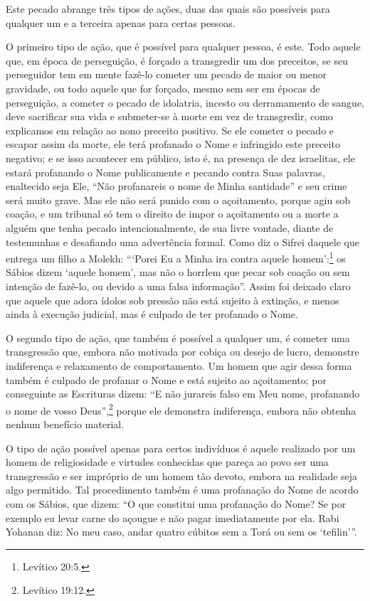 Este pecado abrange três tipos de ações, duas das quais são possíveis
para qualquer um e a terceira apenas para certas pessoas.

O primeiro tipo de ação, que é possível para qualquer pessoa, é este.
Todo aquele que, em época de perseguição, é forçado a transgredir um dos
preceitos, se seu perseguidor tem em mente fazê-lo cometer um pecado de
maior ou menor gravidade, ou todo aquele que for forçado, mesmo sem ser
em épocas de perseguição, a cometer o pecado de idolatria, incesto ou
derramamento de sangue, deve sacrificar sua vida e submeter-se à morte
em vez de transgredir, como explicamos em relação ao nono preceito
positivo. Se ele cometer o pecado e escapar assim da morte, ele terá
profanado o Nome e infringido este preceito negativo; e se isso
acontecer em público, isto é, na presença de dez israelitas, ele estará
profanando o Nome publicamente e pecando contra Suas palavras,
enaltecido seja Ele, ``Não profanareis o nome de Minha santidade'' e seu
crime será muito grave. Mas ele não será punido com o açoitamento,
porque agiu sob coação, e um tribunal só tem o direito de impor o
açoitamento ou a morte a alguém que tenha pecado intencionalmente, de
sua livre vontade, diante de testemunhas e desafiando uma advertência
formal. Como diz o Sifrei daquele que entrega um filho a Molekh:
```Porei Eu a Minha ira contra aquele homem':\footnote{Levítico 20:5.} os Sábios
dizem `aquele homem', mas não o horrlem que pecar sob coação ou sem
intenção de fazê-lo, ou devido a uma falsa informação''. Assim foi
deixado claro que aquele que adora ídolos sob pressão não está sujeito à
extinção, e menos ainda à execução judicial, mas é culpado de ter
profanado o Nome.

O segundo tipo de ação, que também é possível a qualquer um, é cometer
uma transgressão que, embora não motivada por cobiça ou desejo de lucro,
demonstre indiferença e relaxamento de comportamento. Um homem que agir
dessa forma também é culpado de profanar o Nome e está sujeito ao
açoitamento; por conseguinte as Escrituras dizem: ``E não jurareis falso
em Meu nome, profanando o nome de vosso Deus'',\footnote{Levítico 19:12.} porque
ele demonstra indiferença, embora não obtenha nenhum benefício
material.

O tipo de ação possível apenas para certos indivíduos é aquele realizado
por um homem de religiosidade e virtudes conhecidas que pareça ao povo
ser uma transgressão e ser impróprio de um homem tão devoto, embora na
realidade seja algo permitido. Tal procedimento também é uma profanação
do Nome de acordo com os Sábios, que dizem: ``O que constitui uma
profanação do Nome? Se por exemplo eu levar carne do açougue e não
pagar imediatamente por ela. Rabi Yohanan diz: No meu caso, andar
quatro cúbitos sem a Torá ou sem os `tefilin'''.

